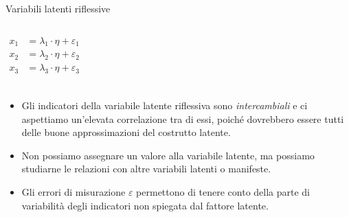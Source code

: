 \documentclass{beamer}
\begin{document}
\begin{frame}{Variabili latenti riflessive}
    \begin{columns}
    \[
    \begin{aligned}
    x_1 &= \lambda_1 \cdot \eta + \varepsilon_1 \\
    x_2 &= \lambda_2 \cdot \eta + \varepsilon_2 \\
    x_3 &= \lambda_3 \cdot \eta + \varepsilon_3 \\
    \end{aligned}
    \]
    \end{columns}
    \vspace{1em}
    \pause
    \small
    \begin{itemize}
        \item Gli indicatori della variabile latente riflessiva sono \textit{intercambiali} e ci aspettiamo un'elevata correlazione tra di essi, poiché dovrebbero essere tutti delle buone approssimazioni del costrutto latente.
        \item Non possiamo assegnare un valore alla variabile latente, ma possiamo studiarne le relazioni con altre variabili latenti o manifeste.
        \item Gli errori di misurazione $\varepsilon$ permettono di tenere conto della parte di variabilità degli indicatori non spiegata dal fattore latente. 
    \end{itemize}
\end{frame}
\end{document}
